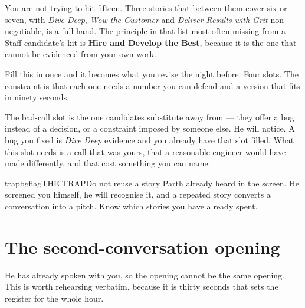 \documentclass[10pt,twoside]{book}
\makeatletter
\newcommand{\cchapter}[1]{\chapter{#1}}
\newcommand{\csection}[1]{\par\vspace{13pt}\noindent{\sffamily\large\bfseries\color{ink}\raggedright #1\par}\vspace{4pt}}
\newenvironment{callouttrap}{\begin{co@box}{trapbg}{flag}{THE TRAP}}{\end{co@box}}
\makeatother
\begin{document}
You are not trying to hit fifteen. Three stories that between them cover six or seven, with \textit{Dive Deep}, \textit{Wow the Customer} and \textit{Deliver Results with Grit} non-negotiable, is a full hand. The principle in that list most often missing from a Staff candidate's kit is \textbf{Hire and Develop the Best}, because it is the one that cannot be evidenced from your own work.\par
\csection{The story portfolio}
Fill this in once and it becomes what you revise the night before. Four slots. The constraint is that each one needs a number you can defend and a version that fits in ninety seconds.\par
\par{}\par\medskip
The bad-call slot is the one candidates substitute away from --- they offer a bug instead of a decision, or a constraint imposed by someone else. He will notice. A bug you fixed is \textit{Dive Deep} evidence and you already have that slot filled. What this slot needs is a call that was yours, that a reasonable engineer would have made differently, and that cost something you can name.\par
\begin{callouttrap}Do not reuse a story Parth already heard in the screen. He screened you himself, he will recognise it, and a repeated story converts a conversation into a pitch. Know which stories you have already spent.\end{callouttrap}
\cchapter{The second-conversation opening}
He has already spoken with you, so the opening cannot be the same opening. This is worth rehearsing verbatim, because it is thirty seconds that sets the register for the whole hour.\par
\end{document}
